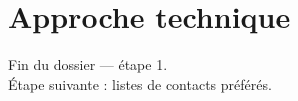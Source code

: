 \documentclass[11pt,a4paper,oneside]{report}
\begin{document}


\part{Approche technique}



\vfill
\begin{center}\small\color{AlanyaGray}\sffamily
Fin du dossier --- étape 1. \\
Étape suivante : listes de contacts préférés.
\end{center}
\end{document}
